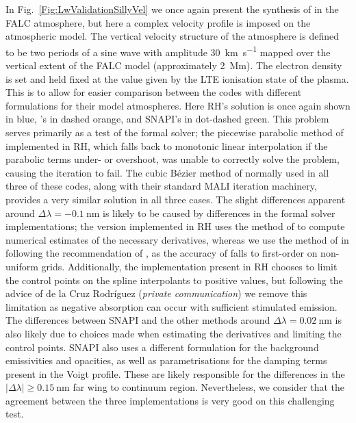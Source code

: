 In Fig.~\ref{Fig:LwValidationSillyVel} we once again present the synthesis of \CaLine{} in the FALC atmosphere, but here a complex velocity profile is imposed on the atmospheric model.
The vertical velocity structure of the atmosphere is defined to be two periods of a sine wave with amplitude \SI{30}{\kilo\metre\per\second} mapped over the vertical extent of the FALC model (approximately \SI{2}{\mega\metre}).
The electron density is set and held fixed at the value given by the LTE ionisation state of the plasma.
This is to allow for easier comparison between the codes with different formulations for their model atmospheres.
Here RH's solution is once again shown in blue, \Lw{}'s in dashed orange, and SNAPI's in dot-dashed green.
This problem serves primarily as a test of the formal solver; the piecewise parabolic method of \citet{Auer1994} implemented in RH, which falls back to monotonic linear interpolation if the parabolic terms under- or overshoot, was unable to correctly solve the problem, causing the iteration to fail.
The cubic Bézier method of \citet{DelaCruzRodriguez2013} normally used in all three of these codes, along with their standard MALI iteration machinery, provides a very similar solution in all three cases.
The slight differences apparent around $\Delta\lambda=\SI{-0.1}{\nano\metre}$ is likely to be caused by differences in the formal solver implementations; the version implemented in RH uses the method of \citet{Fritsch1984} to compute numerical estimates of the necessary derivatives, whereas we use the method of \citet{Steffen1990} in \Lw{} following the recommendation of \citet{Janett2018}, as the accuracy of \citet{Fritsch1984} falls to first-order on non-uniform grids.
Additionally, the implementation present in RH chooses to limit the control points on the spline interpolants to positive values, but following the advice of de la Cruz Rodríguez (\emph{private communication}) we remove this limitation as negative absorption can occur with sufficient stimulated emission.
The differences between SNAPI and the other methods around $\Delta\lambda=\SI{0.02}{\nano\metre}$ is also likely due to choices made when estimating the derivatives and limiting the control points.
SNAPI also uses a different formulation for the background emissivities and opacities, as well as parametrisations for the damping terms present in the Voigt profile.
These are likely responsible for the differences in the $|\Delta\lambda| \geq \SI{0.15}{\nano\metre}$ far wing to continuum region.
Nevertheless, we consider that the agreement between the three implementations is very good on this challenging test.

